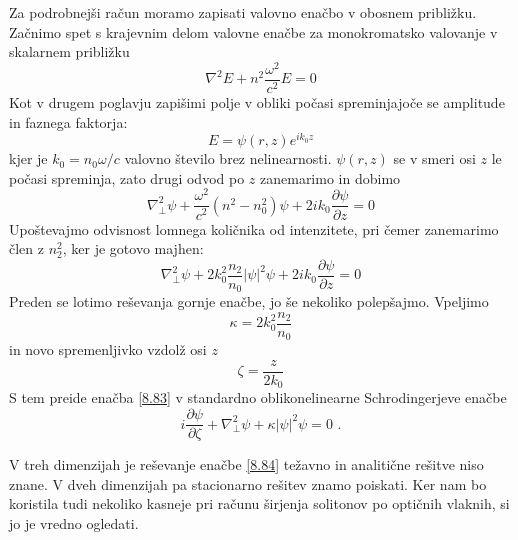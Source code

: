 Za podrobnejši račun moramo zapisati valovno enačbo v obosnem približku.
Začnimo spet s krajevnim delom valovne enačbe za monokromatsko valovanje
v skalarnem približku 
\begin{equation}
\nabla^{2}E+n^{2}\frac{\omega^{2}}{c^{2}}E=0\label{8.80}
\end{equation}
 Kot v drugem poglavju zapišimi polje v obliki počasi spreminjajoče
se amplitude in faznega faktorja: 
\begin{equation}
E=\psi(r,z)e^{ik_{0}z}\label{8.81}
\end{equation}
 kjer je $k_{0}=n_{0}\omega/c$ valovno število brez nelinearnosti.
$\psi(r,z)$ se v smeri osi $z$ le počasi spreminja, zato drugi odvod
po $z$ zanemarimo in dobimo 
\begin{equation}
\nabla_{\bot}^{2}\psi+\frac{\omega^{2}}{c^{2}}(n^{2}-n_{0}^{2})\psi+2ik_{0}\frac{\partial\psi}{\partial z}=0\label{8.82}
\end{equation}
 Upoštevajmo odvisnost lomnega količnika od intenzitete, pri čemer
zanemarimo člen z $n_{2}^{2}$, ker je gotovo majhen: 
\begin{equation}
\nabla_{\bot}^{2}\psi+2k_{0}^{2}\frac{n_{2}}{n_{0}}|\psi|^{2}\psi+2ik_{0}\frac{\partial\psi}{\partial z}=0\label{8.83}
\end{equation}
 Preden se lotimo reševanja gornje enačbe, jo še nekoliko polepšajmo.
Vpeljimo 
\begin{equation}
\kappa=2k_{0}^{2}\frac{n_{2}}{n_{0}}
\end{equation}
 in novo spremenljivko vzdolž osi $z$
\begin{equation}
\zeta=\frac{z}{2k_{0}}
\end{equation}
 S tem preide enačba \ref{8.83} v standardno oblikonelinearne Schrodingerjeve
enačbe 
\begin{equation}
i\frac{\partial\psi}{\partial\zeta}+\nabla_{\bot}^{2}\psi+\kappa\left|\psi\right|^{2}\psi=0\text{ .}\label{8.84}
\end{equation}


V treh dimenzijah je reševanje enačbe \ref{8.84} težavno in analitične
rešitve niso znane. V dveh dimenzijah pa stacionarno rešitev znamo
poiskati. Ker nam bo koristila tudi nekoliko kasneje pri računu širjenja
solitonov po optičnih vlaknih, si jo je vredno ogledati.

